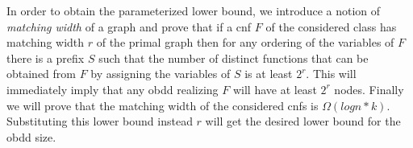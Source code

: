 \documentclass{article}
\begin{document}
\begin{comment}
In \cite{VardiTWD}, Ferrara, Pan, and Vardi showed that for any {\sc cnf} with $n$
variables and treewidth $k$ of the primal graph can be compiled into an Ordered Binary 
Decision Diagram ({\sc obdd}) of size
$O(n^k)$. A natural question is whether there is a Fixed-Parameter upper bound on the
size of the {\sc obdd}, i.e. the one represented in the form $f(k)n^c$ where $f(k)$
is some exponential (or even superexponential) function and $c$ is a constant independent
on $k$. In this paper we prove that this is impossible. In particular, we show 
that for each $k$ there is a function $f(n,k)=n^{k/4}/o(n)$
and an infinite class of {\sc cnf}s with treewidth at most $k$ of the 
primal graph such that for each element $F$ of this class the size of the smallest
possible {\sc obdd} computing $F$ is at least $f(n,k)$.
This result shows impossibility of not only a fixed-parameter upper bound, but also 
of a sublinear dependence on $k$ in the base of the exponent or even of 
an exponent $k/C$ for some large constant $C$. On the positive side, we show that 
the $O(n^k)$ upper bound holds for the case where $k$ is the treewidth of the 
incidence graph of the given {\sc cnf}. To the best of our knowledge the lower bound reported 
in this paper is the first one ruling out the possibility of fixed-parameter size 
{\sc obdd}s for {\sc cnf}s with a fixed treewidth. 
\end{comment}

\begin{comment}
Our motivation to consider these questions comes from the knowledge compilation perspective.
Indeed, according to \cite{DerMar}, {\sc obdd} can be thought as a special case of {\sc dnnf}
and stronger formalisms such as {\sc dnnf} \cite{DarwicheJACM} and {\sc sdd} \cite{SDD} are known to be size 
{\sc fpt} parameterized by the treewidht of the input {\sc cnf}. Therefore, in order to completely
classify the subclasses w.r.t this parameterization, it is important to understand it regarding
{\sc obdd}. To the best of our knowledge the lower bound reported in this paper is the first one 
ruling out the possibility of fixed-parameter size 
{\sc obdd}s for {\sc cnf}s with a fixed treewidth. 
\end{comment}


In order to obtain the parameterized lower bound, we introduce a notion of \emph{matching width} of a graph
and prove that if a {\sc cnf} $F$ of the considered class
has matching width $r$ of the primal graph then for any ordering of the variables of $F$
there is a prefix $S$ such that the number of distinct functions that can be obtained 
from $F$ by assigning the variables of $S$ is at least $2^r$.
This will immediately imply that any {\sc obdd} realizing
$F$ will have at least $2^r$ nodes. Finally we will prove that the matching width of the considered
{\sc cnf}s is $\Omega (logn*k)$. Substituting this lower bound instead $r$ will get the
desired lower bound for the {\sc obdd} size. 
\end{document}
